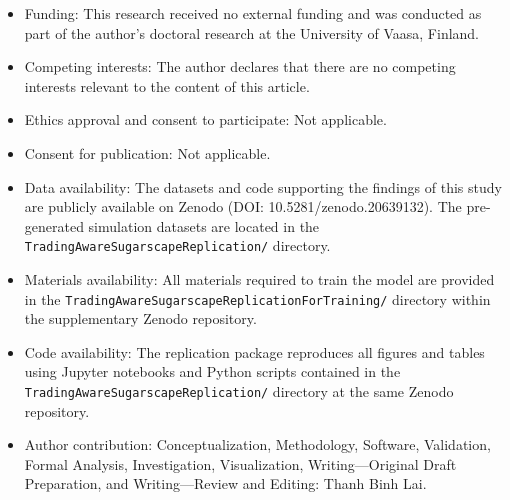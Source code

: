 \documentclass[pdflatex,sn-mathphys-num]{sn-jnl}%
\theoremstyle{thmstyleone}%
\theoremstyle{thmstyletwo}%
\theoremstyle{thmstylethree}%
\begin{document}
\begin{itemize}
\item Funding: This research received no external funding and was conducted as part of the author's doctoral research at the University of Vaasa, Finland.
\item Competing interests: The author declares that there are no competing interests relevant to the content of this article.
\item Ethics approval and consent to participate: Not applicable.
\item Consent for publication: Not applicable.
\item Data availability: The datasets and code supporting the findings of this study are publicly available on Zenodo (DOI: 10.5281/zenodo.20639132). 
  The pre-generated simulation datasets are located in the \texttt{TradingAwareSugarscapeReplication/} directory.
\item Materials availability:  All materials required to train the model are provided in the \texttt{TradingAwareSugarscapeReplicationForTraining/} directory within the supplementary Zenodo repository.
\item Code availability: The replication package reproduces all figures and tables using Jupyter notebooks and Python scripts contained in the \texttt{TradingAwareSugarscapeReplication/} directory at the same Zenodo repository.
\item Author contribution: Conceptualization, Methodology, Software, Validation, Formal Analysis, Investigation, Visualization, Writing---Original Draft Preparation, and Writing---Review and Editing: Thanh Binh Lai.
\end{itemize}


\end{document}
